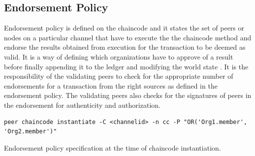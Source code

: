 \documentclass[
  a4paper,  %
  twoside,  %
  bibliography=totoc,
  headsepline,
  cleardoublepage=empty,
  parskip=half,
  draft=false
]{scrbook}
\begin{document}
\subsection{Endorsement Policy}
Endorsement policy is defined on the chaincode and it states the set of peers or nodes on a particular channel that have to execute the the chaincode method and endorse the results obtained from execution for the transaction to be deemed as valid. It is a way of defining which organizations have to approve of a result before finally appending it to the ledger and modifying the world state \cite{Endorsement}. It is the responsibility of the validating peers to check for the appropriate number of endorsements for a transaction from the right sources as defined in the endorsement policy. The validating peers also checks for the signatures of peers in the endorsement for authenticity and authorization.
\begin{Listing}
  \begin{lstlisting}
peer chaincode instantiate -C <channelid> -n cc -P "OR('Org1.member', 'Org2.member')"
\end{lstlisting}
  \caption{Endorsement policy specification at the time of chaincode instantiation.}
  \label{lst:endo}
\end{Listing}
\end{document}
